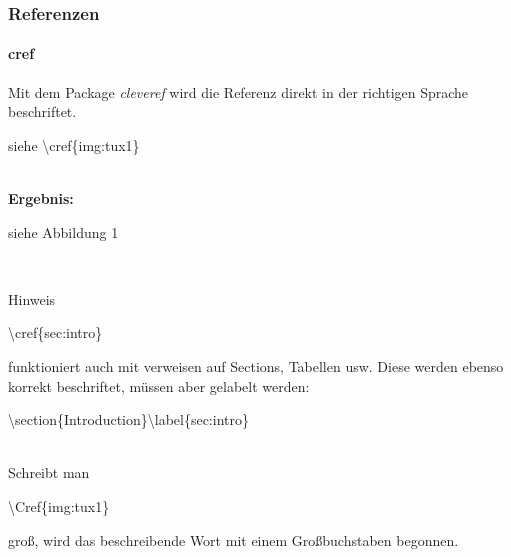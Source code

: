 \begin{frame}
\frametitle{Referenzen}
\framesubtitle{cref}

Mit dem Package \textit{cleveref} wird die Referenz direkt in der richtigen Sprache beschriftet.\\[3mm]

\begin{ttfamily}siehe 
\color{nounibaredI}\textbackslash cref\color{black}\{img:tux1\}\end{ttfamily}\\[3mm]
\textbf{Ergebnis:}\\[3mm]

\begin{rm}
siehe Abbildung 1 \end{rm}\\[3mm]

\medskip

\begin{exampleblock}{Hinweis}
\begin{ttfamily}\color{nounibaredI}\textbackslash cref\color{black}\{sec:intro\}\end{ttfamily} funktioniert auch mit verweisen auf Sections, Tabellen usw. Diese werden ebenso korrekt beschriftet, müssen aber gelabelt werden: \begin{ttfamily}\color{nounibaredI}\textbackslash section\color{black}\{Introduction\}\color{nounibaredI}\textbackslash label\color{black}\{sec:intro\}\end{ttfamily}\\[3mm] %
Schreibt man \begin{ttfamily}\color{nounibaredI}\textbackslash Cref\color{black}\{img:tux1\}\end{ttfamily} groß, wird das beschreibende Wort mit einem Großbuchstaben begonnen.
\end{exampleblock}

\end{frame}
